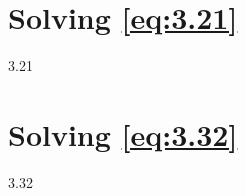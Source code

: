 \startappendix{}
\label{chapter:app1}


\section{Solving \ref{eq:3.21}}

3.21

\section{Solving \ref{eq:3.32}}

3.32


